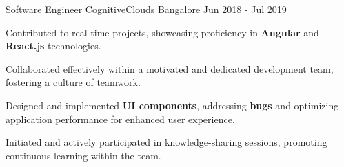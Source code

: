 \begin{cventries}
  \cventry
    {Software Engineer}
    {CognitiveClouds}
    {Bangalore}
    {Jun 2018 - Jul 2019}
    {
      \begin{cvitems}
        \item{Contributed to real-time projects, showcasing proficiency in \textbf{Angular} and \textbf{React.js} technologies.}
        \item{Collaborated effectively within a motivated and dedicated development team, fostering a culture of teamwork.}
        \item{Designed and implemented \textbf{UI components}, addressing \textbf{bugs} and optimizing application performance for enhanced user experience.}
        \item{Initiated and actively participated in knowledge-sharing sessions, promoting continuous learning within the team.}
      \end{cvitems}
    }



\end{cventries}
